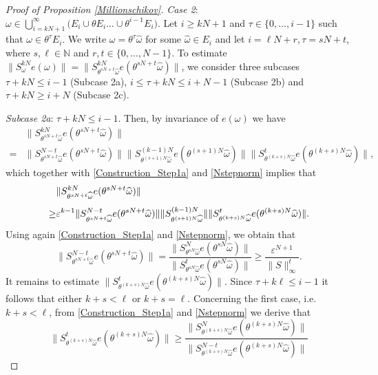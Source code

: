 \documentclass[10pt,a4paper]{amsart}
\newcommand{\N}{\mathbb{N}}
\newcommand{\eps}{\varepsilon}
\begin{document}
\begin{proof}[Proof of Proposition \ref{Millionschikov}]
\noindent
\emph{Case 2}: $\omega\in \bigcup_{i=kN+1}^{\infty}  \Big(E_i\cup \theta E_i\dots\cup\theta^{i-1} E_i\Big)$. Let $i\geq kN+1$ and $\tau\in \{0,\dots,i-1\}$ such that $\omega\in\theta^{\tau }E_i$. We write $\omega=\theta^{\tau}\widehat\omega$ for some $\widehat\omega\in E_i$ and let  $i=\ell N+r, \tau=sN+t$, where $s,\ell\in\N$ and $r,t\in \{0,\dots,N-1\}$. To estimate $\|S_{\omega}^{kN}e(\omega)\|=
\|S^{kN}_{\theta^{sN+t}\widehat\omega}e(\theta^{sN+t}\widehat\omega)\|$, we consider three subcases $\tau+kN\leq i-1$ (Subcase 2a), $i\leq \tau+kN\leq i+N-1$ (Subcase 2b) and $\tau+kN\geq i+N$ (Subcase 2c).

\emph{Subcase 2a}: $\tau+kN\leq i-1$. Then, by invariance of $e(\omega)$ we have 
\begin{align*}
&\|S^{kN}_{\theta^{sN+t}\widehat\omega}e(\theta^{sN+t}\widehat\omega)\|\\[1ex]
=&\|S^{N-t}_{\theta^{sN+t}\widehat\omega}e(\theta^{sN+t}\widehat\omega)\|\|S^{(k-1)N}_{\theta^{(s+1)N}\widehat\omega}e(\theta^{(s+1)N}\widehat\omega)\|
\|S^{t}_{\theta^{(k+s)N}\widehat\omega}e(\theta^{(k+s)N}\widehat\omega)\|,
\end{align*}
which together with \eqref{Construction_Step1a} and \eqref{Nstepnorm} implies that 
\begin{align}
&\|S^{kN}_{\theta^{sN+t}\widehat\omega}e(\theta^{sN+t}\widehat\omega)\|\notag
\\[1ex]
\geq& 
\eps^{k-1} \|S^{N-t}_{\theta^{sN+t}\widehat\omega}e(\theta^{sN+t}\widehat\omega)\|\|S^{(k-1)N}_{\theta^{(s+1)N}\widehat\omega}\|
\|S^{t}_{\theta^{(k+s)N}\widehat\omega}e(\theta^{(k+s)N}\widehat\omega)\|.
\label{Case2a_Eq1}
\end{align}
Using again  \eqref{Construction_Step1a} and \eqref{Nstepnorm}, we obtain that 
\begin{equation}\label{Subcase2a:Eq2}
\|S^{N-t}_{\theta^{sN+t}\widehat\omega}e(\theta^{sN+t}\widehat\omega)\|=\frac{\|S^{N}_{\theta^{sN}\widehat\omega}e(\theta^{sN}\widehat\omega)\|}{\|S^{t}_{\theta^{sN}\widehat\omega}e(\theta^{sN}\widehat\omega)\|}
\geq 
\frac{\eps^{N+1}}{\|S\|_{\infty}^t}.
\end{equation}
It remains to estimate $\|S^{t}_{\theta^{(k+s)N}\widehat\omega}e(\theta^{(k+s)N}\widehat\omega)\|$. Since $\tau+k\ell\leq i-1$ it follows that  either $k+s<\ell$ or $k+s=\ell$. Concerning the first case, i.e. $k+s<\ell$, from  \eqref{Construction_Step1a} and \eqref{Nstepnorm} we derive that 
\[
\|S^{t}_{\theta^{(k+s)N}\widehat\omega}e(\theta^{(k+s)N}\widehat\omega)\|
\geq 
\frac{\|S^{N}_{\theta^{(k+s)N}\widehat\omega}e(\theta^{(k+s)N}\widehat\omega)\|}{\|S^{N-t}_{\theta^{(k+s)N}\widehat\omega}e(\theta^{(k+s)N}\widehat\omega)\|}
\]
\end{proof}
\end{document}
